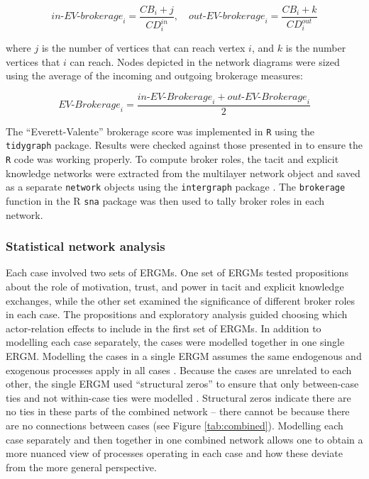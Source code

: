$$\textit{in-EV-brokerage}_i = \frac{CB_i + j}{CD_i^{in}},  \,\,\,\,\,\, \textit{out-EV-brokerage}_i = \frac{CB_i + k}{CD_i^{out}} $$ \medskip

\noindent where $j$ is the number of vertices that can reach vertex $i$, and $k$ is the number vertices that $i$ can reach. Nodes depicted in the network diagrams were sized using the average of the incoming and outgoing brokerage measures: \medskip

$$ \textit{EV-Brokerage}_i = \frac{\textit{in-EV-Brokerage}_i + \textit{out-EV-Brokerage}_i}{2} $$ \medskip

The \enquote{Everett-Valente} brokerage score was implemented in \texttt{R} using the \texttt{tidygraph} package. Results were checked against those presented in \citet{everett2016bridging} to ensure the \texttt{R} code was working properly. To compute \citet{gould1989structures} broker roles, the tacit and explicit knowledge networks were extracted from the multilayer network object and saved as a separate \texttt{network} objects \citep{butts2008network} using the \texttt{intergraph} package \citep{bojanowski2015intergraph}. The \texttt{brokerage} function in the R \texttt{sna} package \citep{butts2016sna} was then used to tally broker roles in each network. 

\subsubsection{Statistical network analysis}

Each case involved two sets of ERGMs. One set of ERGMs tested propositions about the role of motivation, trust, and power in tacit and explicit knowledge exchanges, while the other set examined the significance of different broker roles in each case. The propositions and exploratory analysis guided choosing which actor-relation effects to include in the first set of ERGMs. In addition to modelling each case separately, the cases were modelled together in one single ERGM. Modelling the cases in a single ERGM assumes the same endogenous and exogenous processes apply in all cases \citep{kalish2013brain}. Because the cases are unrelated to each other, the single ERGM used \enquote{structural zeros} to ensure that only between-case ties and not within-case ties were modelled \citep{lusher2012trust}. Structural zeros indicate there are no ties in these parts of the combined network -- there cannot be because there are no connections between cases (see Figure \ref{tab:combined}). Modelling each case separately and then together in one combined network allows one to obtain a more nuanced view of processes operating in each case and how these deviate from the more general perspective. \medskip

